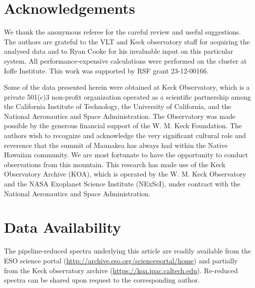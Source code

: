 \documentclass[fleqn,usenatbib]{mnras}
\begin{document}
\section*{Acknowledgements}

We thank the anonymous referee for the careful review and useful suggestions.
The authors are grateful to the VLT and Keck observatory staff for acquiring the analysed data
and to Ryan Cooke for his invaluable input on this particular system.
All performance-expensive calculations were performed on the cluster at Ioffe Institute. This work was supported by RSF grant 23-12-00166.

Some of the data presented herein were obtained at Keck Observatory, which is a private 501(c)3 non-profit organization operated as a scientific partnership among the California Institute of Technology, the University of California, and the National Aeronautics and Space Administration. The Observatory was made possible by the generous financial support of the W. M. Keck Foundation. The authors wish to recognize and acknowledge the very significant cultural role and reverence that the summit of Maunakea has always had within the Native Hawaiian community. We are most fortunate to have the opportunity to conduct observations from this mountain. This research has made use of the Keck Observatory Archive (KOA), which is operated by the W. M. Keck Observatory and the NASA Exoplanet Science Institute (NExScI), under contract with the National Aeronautics and Space Administration.

\section*{Data Availability}

The pipeline-reduced spectra underlying this article are readily available from the ESO science portal (\url{http://archive.eso.org/scienceportal/home}) and partially from the Keck observatory archive (\url{https://koa.ipac.caltech.edu}). Re-reduced spectra can be shared upon request to the corresponding author.






\end{document}
